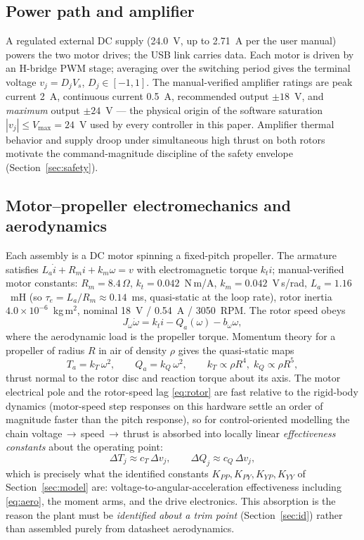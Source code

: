 \documentclass[conference]{IEEEtran}
\begin{document}
\subsection{Power path and amplifier}
A regulated external DC supply (24.0~V, up to 2.71~A per the user manual) powers the two motor drives; the USB link carries data. Each motor is driven by an H-bridge PWM stage; averaging over the switching period gives the terminal voltage $v_j = D_j V_s$, $D_j\in[-1,1]$. The manual-verified amplifier ratings are peak current 2~A, continuous current 0.5~A, recommended output $\pm18$~V, and \emph{maximum} output $\pm24$~V --- the physical origin of the software saturation $|v_j|\le V_{\max} = 24$~V used by every controller in this paper. Amplifier thermal behavior and supply droop under simultaneous high thrust on both rotors motivate the command-magnitude discipline of the safety envelope (Section~\ref{sec:safety}).

\subsection{Motor--propeller electromechanics and aerodynamics}
Each assembly is a DC motor spinning a fixed-pitch propeller. The armature satisfies $L_a\dot i + R_m i + k_m\omega = v$ with electromagnetic torque $k_t i$; manual-verified motor constants: $R_m = 8.4\,\Omega$, $k_t = 0.042$~N\,m/A, $k_m = 0.042$~V\,s/rad, $L_a = 1.16$~mH (so $\tau_e = L_a/R_m \approx 0.14$~ms, quasi-static at the loop rate), rotor inertia $4.0\times10^{-6}$~kg\,m$^2$, nominal 18~V / 0.54~A / 3050~RPM. The rotor speed obeys
\begin{equation}
J_\omega\dot\omega = k_t i - Q_a(\omega) - b_\omega\omega,
\label{eq:rotor}
\end{equation}
where the aerodynamic load is the propeller torque. Momentum theory for a propeller of radius $R$ in air of density $\rho$ gives the quasi-static maps
\begin{equation}
T_a = k_T\,\omega^2,\qquad Q_a = k_Q\,\omega^2,
\qquad k_T \!\propto\! \rho R^4,\; k_Q \!\propto\! \rho R^5,
\label{eq:aero}
\end{equation}
thrust normal to the rotor disc and reaction torque about its axis. The motor electrical pole and the rotor-speed lag \eqref{eq:rotor} are fast relative to the rigid-body dynamics (motor-speed step responses on this hardware settle an order of magnitude faster than the pitch response), so for control-oriented modelling the chain voltage$\,\to\,$speed$\,\to\,$thrust is absorbed into locally linear \emph{effectiveness constants} about the operating point:
\begin{equation}
\Delta T_j \approx c_{T}\,\Delta v_j,\qquad \Delta Q_j \approx c_{Q}\,\Delta v_j,
\label{eq:effectiveness}
\end{equation}
which is precisely what the identified constants $K_{PP},K_{PY},K_{YP},K_{YY}$ of Section~\ref{sec:model} are: voltage-to-angular-acceleration effectiveness including \eqref{eq:aero}, the moment arms, and the drive electronics. This absorption is the reason the plant must be \emph{identified about a trim point} (Section~\ref{sec:id}) rather than assembled purely from datasheet aerodynamics.
\end{document}
